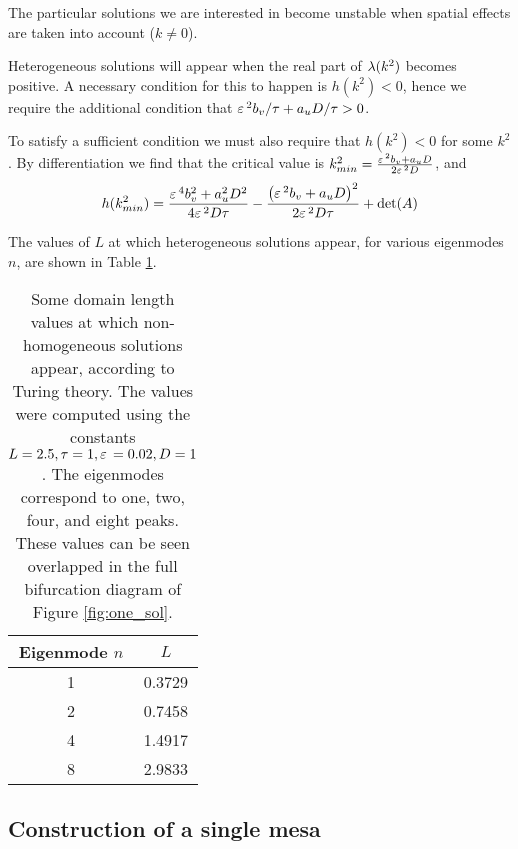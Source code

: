 The particular solutions we are interested in become unstable when spatial effects are taken into account ($k\neq 0$). 

Heterogeneous solutions will appear when the real part of $\lambda(k^2)$ becomes positive. A necessary condition for this to happen is $h(k^2)<0$, hence we require the additional condition that $\varepsilon\,^2b_v/\tau + a_uD/\tau>0$.

To satisfy a sufficient condition we must also require that $h(k^2)<0$ for some $k^2$. By differentiation we find that the critical value is $k^2_{min} = \frac{\varepsilon\,^2b_v + a_uD}{2\varepsilon\,^2D}$, and
% 
$$
h(k^2_{min}) = \frac{\varepsilon\,^4b_v^2 + a_u^2D^2}{4\varepsilon\,^2D\tau} - \frac{\left(\varepsilon\,^2b_v + a_uD\right)^2}{2\varepsilon\,^2D\tau} + \det(A)
$$

The values of $L$ at which heterogeneous solutions appear, for various eigenmodes $n$, are shown in Table \ref{tab:L_turing}.
% 
\begin{table}[h]
\begin{center}
\begin{tabular}{cc}
\toprule
\large{Eigenmode $n$} & \large{$L$}\\
\midrule
1 & 0.3729 \\
2 & 0.7458 \\
4 & 1.4917 \\
8 & 2.9833 \\
\bottomrule
\end{tabular}
\end{center}
\caption{Some domain length values at which non-homogeneous solutions appear, according to Turing theory. The values were computed using the constants $L=2.5,\tau=1,\varepsilon\,=0.02,D=1$. The eigenmodes correspond to one, two, four, and eight peaks. These values can be seen overlapped in the full bifurcation diagram of Figure \ref{fig:one_sol}.}
\label{tab:L_turing}
\end{table}
% 

\subsection{Construction of a single mesa}

